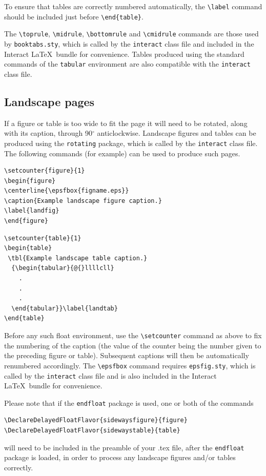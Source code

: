 \documentclass[]{interact}
\theoremstyle{plain}%
\theoremstyle{definition}
\theoremstyle{remark}
\begin{document}
To ensure that tables are correctly numbered automatically, the \verb"\label" command should be included just before \verb"\end{table}".

The \verb"\toprule", \verb"\midrule", \verb"\bottomrule" and \verb"\cmidrule" commands are those used by \verb"booktabs.sty", which is called by the \texttt{interact} class file and included in the \textsf{Interact} \LaTeX\ bundle for convenience. Tables produced using the standard commands of the \texttt{tabular} environment are also compatible with the \texttt{interact} class file.


\subsection{Landscape pages}

If a figure or table is too wide to fit the page it will need to be rotated, along with its caption, through 90$^{\circ}$ anticlockwise. Landscape figures and tables can be produced using the \verb"rotating" package, which is called by the \texttt{interact} class file. The following commands (for example) can be used to produce such pages.
\begin{verbatim}
\setcounter{figure}{1}
\begin{figure}
\centerline{\epsfbox{figname.eps}}
\caption{Example landscape figure caption.}
\label{landfig}
\end{figure}
\end{verbatim}
\begin{verbatim}
\setcounter{table}{1}
\begin{table}
 \tbl{Example landscape table caption.}
  {\begin{tabular}{@{}llllcll}
    .
    .
    .
  \end{tabular}}\label{landtab}
\end{table}
\end{verbatim}
Before any such float environment, use the \verb"\setcounter" command as above to fix the numbering of the caption (the value of the counter being the number given to the preceding figure or table). Subsequent captions will then be automatically renumbered accordingly. The \verb"\epsfbox" command requires \verb"epsfig.sty", which is called by the \texttt{interact} class file and is also included in the \textsf{Interact} \LaTeX\ bundle for convenience.

Please note that if the \verb"endfloat" package is used, one or both of the commands
\begin{verbatim}
\DeclareDelayedFloatFlavor{sidewaysfigure}{figure}
\DeclareDelayedFloatFlavor{sidewaystable}{table}
\end{verbatim}
will need to be included in the preamble of your .tex file, after the \verb"endfloat" package is loaded, in order to process any landscape figures and/or tables correctly.
\end{document}
